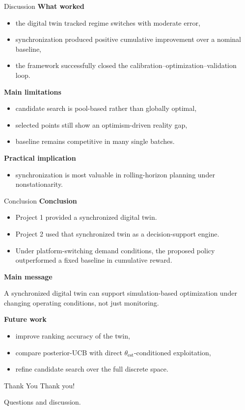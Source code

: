 \documentclass[aspectratio=169,11pt]{beamer}
\begin{document}
\begin{frame}{Discussion}
    \textbf{What worked}
    \begin{itemize}
        \item the digital twin tracked regime switches with moderate error,
        \item synchronization produced positive cumulative improvement over a nominal baseline,
        \item the framework successfully closed the calibration--optimization--validation loop.
    \end{itemize}

    \vspace{0.3cm}
    \textbf{Main limitations}
    \begin{itemize}
        \item candidate search is pool-based rather than globally optimal,
        \item selected points still show an optimism-driven reality gap,
        \item baseline remains competitive in many single batches.
    \end{itemize}

    \vspace{0.3cm}
    \textbf{Practical implication}
    \begin{itemize}
        \item synchronization is most valuable in rolling-horizon planning under nonstationarity.
    \end{itemize}
\end{frame}

\begin{frame}{Conclusion}
    \textbf{Conclusion}
    \begin{itemize}
        \item Project 1 provided a synchronized digital twin.
        \item Project 2 used that synchronized twin as a decision-support engine.
        \item Under platform-switching demand conditions, the proposed policy outperformed a fixed baseline in cumulative reward.
    \end{itemize}

    \vspace{0.4cm}
    \textbf{Main message}
    \begin{block}{}
    A synchronized digital twin can support simulation-based optimization under changing operating conditions, not just monitoring.
    \end{block}

    \vspace{0.3cm}
    \textbf{Future work}
    \begin{itemize}
        \item improve ranking accuracy of the twin,
        \item compare posterior-UCB with direct $\theta_{\text{est}}$-conditioned exploitation,
        \item refine candidate search over the full discrete space.
    \end{itemize}
\end{frame}

\begin{frame}{Thank You}
    \centering
    {\Large Thank you!}

    \vspace{0.6cm}
    Questions and discussion.
\end{frame}
\end{document}
